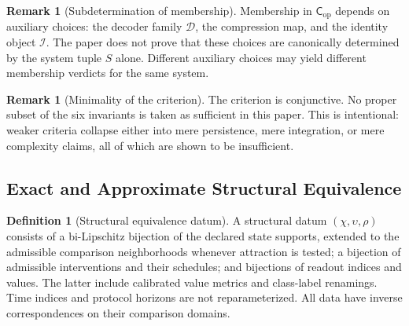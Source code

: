 \documentclass[11pt,a4paper]{article}
\theoremstyle{definition}
\newtheorem{definition}[theorem]{Definition}
\newtheorem{remark}[theorem]{Remark}
\newcommand{\Cop}{\mathsf{C}_{\mathrm{op}}}
\newcommand{\Id}{\mathcal{I}}
\newcommand{\Dec}{\mathscr{D}}
\begin{document}
\begin{remark}[Subdetermination of membership]\label{rem:subdet}
Membership in $\Cop$ depends on auxiliary choices: the decoder family $\Dec$, the compression map, and the identity object $\Id$. The paper does not prove that these choices are canonically determined by the system tuple $S$ alone. Different auxiliary choices may yield different membership verdicts for the same system.
\end{remark}

\begin{remark}[Minimality of the criterion]
The criterion is conjunctive. No proper subset of the six invariants is taken as sufficient in this paper. This is intentional: weaker criteria collapse either into mere persistence, mere integration, or mere complexity claims, all of which are shown to be insufficient.
\end{remark}

\subsection{Exact and Approximate Structural Equivalence}
\begin{definition}[Structural equivalence datum]\label{def:eqdatum}
A structural datum $(\chi,\upsilon,\rho)$ consists of a bi-Lipschitz bijection of the declared state supports, extended to the admissible comparison neighborhoods whenever attraction is tested; a bijection of admissible interventions and their schedules; and bijections of readout indices and values. The latter include calibrated value metrics and class-label renamings. Time indices and protocol horizons are not reparameterized. All data have inverse correspondences on their comparison domains.
\end{definition}
\end{document}

